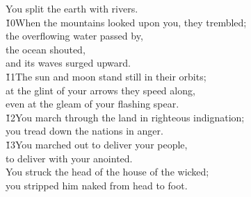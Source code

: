 \begin{poetry}
\poemlll       You split the earth with rivers. \\
\poeml \v{10}When the mountains looked upon you, they trembled; \\
\poemll    the overflowing water passed by, \\
\poeml the ocean shouted, \\
\poemll    and its waves surged upward. \\
\poeml \v{11}The sun and moon stand still in their orbits; \\
\poemll    at the glint of your arrows they speed along, \\
\poemlll       even at the gleam of your flashing spear. \\
\poeml \v{12}You march through the land in righteous indignation; \\
\poemll    you tread down the nations in anger. \\
\poeml \v{13}You marched out to deliver your people, \\
\poemll    to deliver with your anointed. \\
\poeml You struck the head of the house of the wicked; \\
\poemll    you stripped him naked from head to foot.
\end{poetry}

